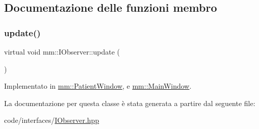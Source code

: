 \subsection{Documentazione delle funzioni membro}
\mbox{\label{classmm_1_1_i_observer_a6422af04f8e9f3ba9d6d412a3bcdd03e}} 
\subsubsection{\texorpdfstring{update()}{update()}}
{\footnotesize\ttfamily virtual void mm\+::\+I\+Observer\+::update (\begin{DoxyParamCaption}{ }\end{DoxyParamCaption})\hspace{0.3cm}{\ttfamily [pure virtual]}}



Implementato in \hyperlink{classmm_1_1_patient_window_a461de186f72a8902a9f95a622dc1c02b}{mm\+::\+Patient\+Window}, e \hyperlink{classmm_1_1_main_window_ac0fc4875dc774c1b7b1ca59d174a7fc1}{mm\+::\+Main\+Window}.



La documentazione per questa classe è stata generata a partire dal seguente file\+:\begin{DoxyCompactItemize}
\item 
code/interfaces/\hyperlink{_i_observer_8hpp}{I\+Observer.\+hpp}\end{DoxyCompactItemize}
